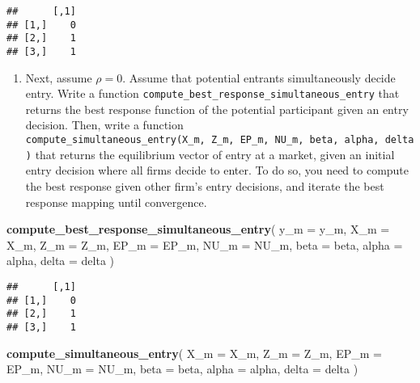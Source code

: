 \documentclass[
]{book}
\newenvironment{Shaded}{\begin{snugshade}}{\end{snugshade}}
\newcommand{\AttributeTok}[1]{\textcolor[rgb]{0.13,0.29,0.53}{#1}}
\newcommand{\FunctionTok}[1]{\textcolor[rgb]{0.13,0.29,0.53}{\textbf{#1}}}
\newcommand{\NormalTok}[1]{#1}
\providecommand{\tightlist}{%
  \setlength{\itemsep}{0pt}\setlength{\parskip}{0pt}}
\begin{document}
\begin{verbatim}
##      [,1]
## [1,]    0
## [2,]    1
## [3,]    1
\end{verbatim}

\begin{enumerate}
\def\labelenumi{\arabic{enumi}.}
\setcounter{enumi}{5}
\tightlist
\item
  Next, assume \(\rho = 0\). Assume that potential entrants simultaneously decide entry. Write a function \texttt{compute\_best\_response\_simultaneous\_entry} that returns the best response function of the potential participant given an entry decision. Then, write a function \texttt{compute\_simultaneous\_entry(X\_m,\ Z\_m,\ EP\_m,\ NU\_m,\ beta,\ alpha,\ delta)} that returns the equilibrium vector of entry at a market, given an initial entry decision where all firms decide to enter. To do so, you need to compute the best response given other firm's entry decisions, and iterate the best response mapping until convergence.
\end{enumerate}

\begin{Shaded}
\begin{Highlighting}[]
\FunctionTok{compute\_best\_response\_simultaneous\_entry}\NormalTok{(}
    \AttributeTok{y\_m =}\NormalTok{ y\_m,}
    \AttributeTok{X\_m =}\NormalTok{ X\_m, }
    \AttributeTok{Z\_m =}\NormalTok{ Z\_m, }
    \AttributeTok{EP\_m =}\NormalTok{ EP\_m, }
    \AttributeTok{NU\_m =}\NormalTok{ NU\_m, }
    \AttributeTok{beta =}\NormalTok{ beta, }
    \AttributeTok{alpha =}\NormalTok{ alpha, }
    \AttributeTok{delta =}\NormalTok{ delta}
\NormalTok{    ) }
\end{Highlighting}
\end{Shaded}

\begin{verbatim}
##      [,1]
## [1,]    0
## [2,]    1
## [3,]    1
\end{verbatim}

\begin{Shaded}
\begin{Highlighting}[]
\FunctionTok{compute\_simultaneous\_entry}\NormalTok{(}
  \AttributeTok{X\_m =}\NormalTok{ X\_m, }
  \AttributeTok{Z\_m =}\NormalTok{ Z\_m, }
  \AttributeTok{EP\_m =}\NormalTok{ EP\_m, }
  \AttributeTok{NU\_m =}\NormalTok{ NU\_m, }
  \AttributeTok{beta =}\NormalTok{ beta, }
  \AttributeTok{alpha =}\NormalTok{ alpha,}
  \AttributeTok{delta =}\NormalTok{ delta}
\NormalTok{  )}
\end{Highlighting}
\end{Shaded}
\end{document}
